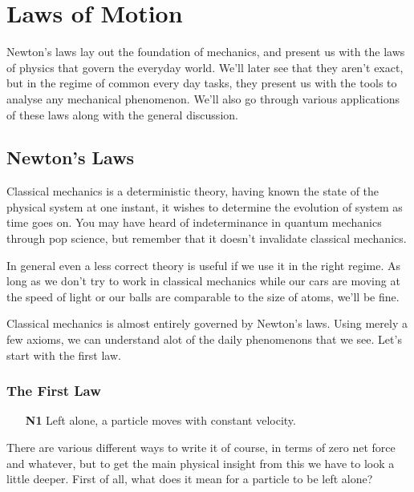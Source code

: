 \setlength{\chnumsep}{11.6em}
\chapter{Laws of Motion}

\begin{overview}
    Newton's laws lay out the foundation of mechanics, and present us with the laws of physics 
    that govern the everyday world. We'll later see that they aren't exact, but in the regime of common 
    every day tasks, they present us with the tools to analyse any mechanical phenomenon. We'll also go 
    through various applications of these laws along with the general discussion.
\end{overview}

\section{Newton's Laws}

Classical mechanics is a deterministic theory, having known the state of the physical system at one instant,
it wishes to determine the evolution of system as time goes on. You may have heard of indeterminance in quantum 
mechanics through pop science, but remember that it doesn't invalidate classical mechanics. 

In general 
even a less correct theory is useful if we use it in the right regime. As long as we don't try to work 
in classical mechanics while our cars are moving at the speed of light or our balls are comparable to 
the size of atoms, we'll be fine.

Classical mechanics is almost entirely governed by Newton's laws. Using merely a few axioms, 
we can understand alot of the daily phenomenons that we see. Let's start with the first law. 

\subsection{The First Law}

\begin{enumerate}
    \item[\textbf{N1}] Left alone, a particle moves with constant velocity.
\end{enumerate}

There are various different ways to write it of course, in terms of zero net force and whatever, but to 
get the main physical insight from this we have to look a little deeper. First of all, what does it mean for 
a particle to be left alone? 

